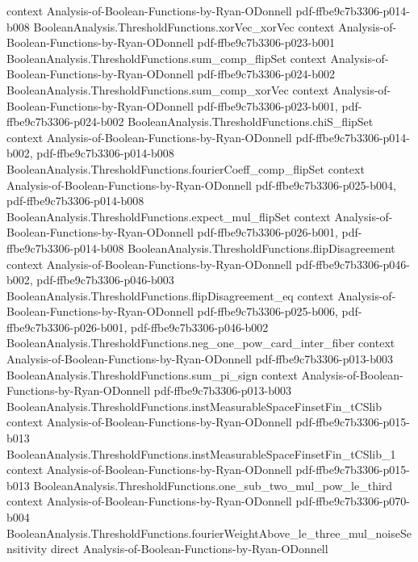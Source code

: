 \begin{lemma}
  {context}
  {Analysis-of-Boolean-Functions-by-Ryan-ODonnell}
  {pdf-ffbe9c7b3306-p014-b008}
\proofstep
  {BooleanAnalysis.ThresholdFunctions.xorVec_xorVec}
  {context}
  {Analysis-of-Boolean-Functions-by-Ryan-ODonnell}
  {pdf-ffbe9c7b3306-p023-b001}
\proofstep
  {BooleanAnalysis.ThresholdFunctions.sum_comp_flipSet}
  {context}
  {Analysis-of-Boolean-Functions-by-Ryan-ODonnell}
  {pdf-ffbe9c7b3306-p024-b002}
\proofstep
  {BooleanAnalysis.ThresholdFunctions.sum_comp_xorVec}
  {context}
  {Analysis-of-Boolean-Functions-by-Ryan-ODonnell}
  {pdf-ffbe9c7b3306-p023-b001,
    pdf-ffbe9c7b3306-p024-b002}
\proofstep
  {BooleanAnalysis.ThresholdFunctions.chiS_flipSet}
  {context}
  {Analysis-of-Boolean-Functions-by-Ryan-ODonnell}
  {pdf-ffbe9c7b3306-p014-b002,
    pdf-ffbe9c7b3306-p014-b008}
\proofstep
  {BooleanAnalysis.ThresholdFunctions.fourierCoeff_comp_flipSet}
  {context}
  {Analysis-of-Boolean-Functions-by-Ryan-ODonnell}
  {pdf-ffbe9c7b3306-p025-b004,
    pdf-ffbe9c7b3306-p014-b008}
\proofstep
  {BooleanAnalysis.ThresholdFunctions.expect_mul_flipSet}
  {context}
  {Analysis-of-Boolean-Functions-by-Ryan-ODonnell}
  {pdf-ffbe9c7b3306-p026-b001,
    pdf-ffbe9c7b3306-p014-b008}
\proofstep
  {BooleanAnalysis.ThresholdFunctions.flipDisagreement}
  {context}
  {Analysis-of-Boolean-Functions-by-Ryan-ODonnell}
  {pdf-ffbe9c7b3306-p046-b002,
    pdf-ffbe9c7b3306-p046-b003}
\proofstep
  {BooleanAnalysis.ThresholdFunctions.flipDisagreement_eq}
  {context}
  {Analysis-of-Boolean-Functions-by-Ryan-ODonnell}
  {pdf-ffbe9c7b3306-p025-b006,
    pdf-ffbe9c7b3306-p026-b001,
    pdf-ffbe9c7b3306-p046-b002}
\proofstep
  {BooleanAnalysis.ThresholdFunctions.neg_one_pow_card_inter_fiber}
  {context}
  {Analysis-of-Boolean-Functions-by-Ryan-ODonnell}
  {pdf-ffbe9c7b3306-p013-b003}
\proofstep
  {BooleanAnalysis.ThresholdFunctions.sum_pi_sign}
  {context}
  {Analysis-of-Boolean-Functions-by-Ryan-ODonnell}
  {pdf-ffbe9c7b3306-p013-b003}
\proofstep
  {BooleanAnalysis.ThresholdFunctions.instMeasurableSpaceFinsetFin_tCSlib}
  {context}
  {Analysis-of-Boolean-Functions-by-Ryan-ODonnell}
  {pdf-ffbe9c7b3306-p015-b013}
\proofstep
  {BooleanAnalysis.ThresholdFunctions.instMeasurableSpaceFinsetFin_tCSlib_1}
  {context}
  {Analysis-of-Boolean-Functions-by-Ryan-ODonnell}
  {pdf-ffbe9c7b3306-p015-b013}
\proofstep
  {BooleanAnalysis.ThresholdFunctions.one_sub_two_mul_pow_le_third}
  {context}
  {Analysis-of-Boolean-Functions-by-Ryan-ODonnell}
  {pdf-ffbe9c7b3306-p070-b004}
\proofstep
  {BooleanAnalysis.ThresholdFunctions.fourierWeightAbove_le_three_mul_noiseSensitivity}
  {direct}
  {Analysis-of-Boolean-Functions-by-Ryan-ODonnell}

\end{lemma}
